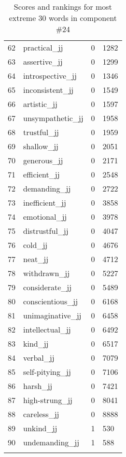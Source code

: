 \begin{longtable}[!htbp]{| rlr@{.}l |}
    62 & practical\_jj & 0 & 1282 \\
    63 & assertive\_jj & 0 & 1299 \\
    64 & introspective\_jj & 0 & 1346 \\
    65 & inconsistent\_jj & 0 & 1549 \\
    66 & artistic\_jj & 0 & 1597 \\
    67 & unsympathetic\_jj & 0 & 1958 \\
    68 & trustful\_jj & 0 & 1959 \\
    69 & shallow\_jj & 0 & 2051 \\
    70 & generous\_jj & 0 & 2171 \\
    71 & efficient\_jj & 0 & 2548 \\
    72 & demanding\_jj & 0 & 2722 \\
    73 & inefficient\_jj & 0 & 3858 \\
    74 & emotional\_jj & 0 & 3978 \\
    75 & distrustful\_jj & 0 & 4047 \\
    76 & cold\_jj & 0 & 4676 \\
    77 & neat\_jj & 0 & 4712 \\
    78 & withdrawn\_jj & 0 & 5227 \\
    79 & considerate\_jj & 0 & 5489 \\
    80 & conscientious\_jj & 0 & 6168 \\
    81 & unimaginative\_jj & 0 & 6458 \\
    82 & intellectual\_jj & 0 & 6492 \\
    83 & kind\_jj & 0 & 6517 \\
    84 & verbal\_jj & 0 & 7079 \\
    85 & self-pitying\_jj & 0 & 7106 \\
    86 & harsh\_jj & 0 & 7421 \\
    87 & high-strung\_jj & 0 & 8041 \\
    88 & careless\_jj & 0 & 8888 \\
    89 & unkind\_jj & 1 & 530 \\
    90 & undemanding\_jj & 1 & 588 \\
    \hline
    \caption{Scores and rankings for most extreme 30 words in component \#24} \\
\end{longtable}
